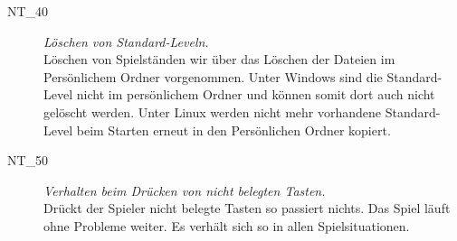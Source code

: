 \begin{description}

\label{NT:40}
	
	\item[NT\_40] \textit{Löschen von Standard-Leveln.} \hfill\\
	
	Löschen von Spielständen wir über das Löschen der Dateien im Persönlichem Ordner vorgenommen.
	Unter Windows sind die Standard-Level nicht im persönlichem Ordner und können somit dort auch nicht gelöscht werden.
	Unter Linux werden nicht mehr vorhandene Standard-Level beim Starten erneut in den Persönlichen Ordner kopiert.\\
	


\label{NT:50}	
	
	\item[NT\_50] \textit{Verhalten beim Drücken von nicht belegten Tasten.} \hfill\\

	Drückt der Spieler nicht belegte Tasten so passiert nichts. Das Spiel läuft ohne Probleme weiter. Es verhält sich so in allen Spielsituationen.\\
	
\end{description}


